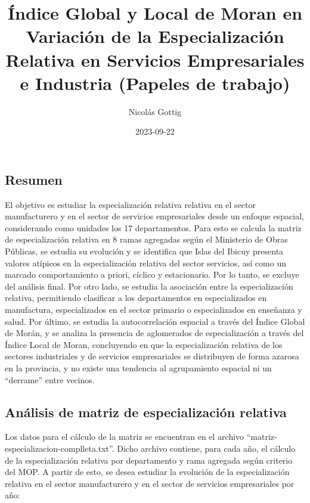 \documentclass[
]{article}
\title{Índice Global y Local de Moran en Variación de la Especialización
Relativa en Servicios Empresariales e Industria (Papeles de trabajo)}
\author{Nicolás Gottig}
\date{2023-09-22}
\begin{document}
\maketitle

\hypertarget{resumen}{%
\subsection{Resumen}\label{resumen}}

El objetivo es estudiar la especialización relativa relativa en el
sector manufacturero y en el sector de servicios empresariales desde un
enfoque espacial, considerando como unidades los 17 departamentos. Para
esto se calcula la matriz de especialización relativa en 8 ramas
agregadas según el Ministerio de Obras Públicas, se estudia su evolución
y se identifica que Islas del Ibicuy presenta valores atípicos en la
especialización relativa del sector servicios, así como un marcado
comportamiento a priori, cíclico y estacionario. Por lo tanto, se
excluye del análisis final. Por otro lado, se estudia la asociación
entre la especialización relativa, permitiendo clasificar a los
departamentos en especializados en manufactura, especializados en el
sector primario o especializados en enseñanza y salud. Por último, se
estudia la autocorrelación espacial a través del Índice Global de Morán,
y se analiza la presencia de aglomerados de especialización a través del
Índice Local de Moran, concluyendo en que la especialización relativa de
los sectores industriales y de servicios empresariales se distribuyen de
forma azarosa en la provincia, y no existe una tendencia al agrupamiento
espacial ni un ``derrame'' entre vecinos.

\hypertarget{anuxe1lisis-de-matriz-de-especializaciuxf3n-relativa}{%
\subsection{Análisis de matriz de especialización
relativa}\label{anuxe1lisis-de-matriz-de-especializaciuxf3n-relativa}}

Los datos para el cálculo de la matriz se encuentran en el archivo
``matriz-especializacion-complleta.txt''. Dicho archivo contiene, para
cada año, el cálculo de la especialización relativa por departamento y
rama agregada según criterio del MOP. A partir de esto, se desea
estudiar la evolución de la especialización relativa en el sector
manufacturero y en el sector de servicios empresariales por año:
\end{document}
